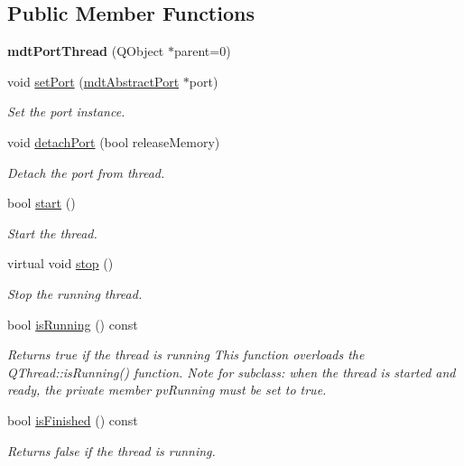 \subsection*{Public Member Functions}
\begin{DoxyCompactItemize}
\item 
\hypertarget{classmdt_port_thread_aa20869c68d7a016f9e547464f0d8b71e}{
{\bfseries mdtPortThread} (QObject $\ast$parent=0)}
\label{classmdt_port_thread_aa20869c68d7a016f9e547464f0d8b71e}

\item 
void \hyperlink{classmdt_port_thread_acd51474c3a2683676423317bc9cb31b2}{setPort} (\hyperlink{classmdt_abstract_port}{mdtAbstractPort} $\ast$port)
\begin{DoxyCompactList}\small\item\em Set the port instance. \end{DoxyCompactList}\item 
void \hyperlink{classmdt_port_thread_a29b434534a5564efbd9dfe570a61b143}{detachPort} (bool releaseMemory)
\begin{DoxyCompactList}\small\item\em Detach the port from thread. \end{DoxyCompactList}\item 
bool \hyperlink{classmdt_port_thread_a9c45f260b8d58b7475151df79b3d8510}{start} ()
\begin{DoxyCompactList}\small\item\em Start the thread. \end{DoxyCompactList}\item 
virtual void \hyperlink{classmdt_port_thread_a5746ea96689ed80179751ad1353f0b39}{stop} ()
\begin{DoxyCompactList}\small\item\em Stop the running thread. \end{DoxyCompactList}\item 
\hypertarget{classmdt_port_thread_ae1becf17263dd9fbf5dfcc6c51eddd72}{
bool \hyperlink{classmdt_port_thread_ae1becf17263dd9fbf5dfcc6c51eddd72}{isRunning} () const }
\label{classmdt_port_thread_ae1becf17263dd9fbf5dfcc6c51eddd72}

\begin{DoxyCompactList}\small\item\em Returns true if the thread is running This function overloads the QThread::isRunning() function. Note for subclass: when the thread is started and ready, the private member pvRunning must be set to true. \end{DoxyCompactList}\item 
bool \hyperlink{classmdt_port_thread_a55d7ef615447823bf9878492a2c88fd4}{isFinished} () const 
\begin{DoxyCompactList}\small\item\em Returns false if the thread is running. \end{DoxyCompactList}\end{DoxyCompactItemize}
